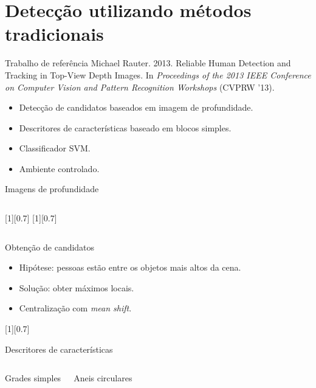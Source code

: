\section{Detecção utilizando métodos tradicionais}

\begin{frame}{Trabalho de referência}
	Michael Rauter. 2013. Reliable Human Detection and Tracking in Top-View Depth Images. In \textit{Proceedings of the 2013 IEEE Conference on Computer Vision and Pattern Recognition Workshops} (CVPRW '13).

	\begin{itemize}
		\item Detecção de candidatos baseados em imagem de profundidade.
		\item Descritores de características baseado em blocos simples.
		\item Classificador SVM.
		\item Ambiente controlado.
	\end{itemize}
\end{frame}

\begin{frame}{Imagens de profundidade}
\begin{columns}[T]
 [1][0.7]
 [1][0.7]
\end{columns}
\end{frame}

\begin{frame}{Obtenção de candidatos}
	\begin{itemize}
	\item Hipótese: pessoas estão entre os objetos mais altos da cena.
	\item Solução: obter máximos locais.
	\item Centralização com \textit{mean shift}.
	\end{itemize}

	[0.7]
\end{frame}

\begin{frame}{Descritores de características}
	\begin{columns}[T]
		\center Grades simples

		\center Aneis circulares
	\end{columns}
\end{frame}



